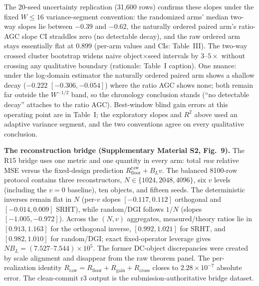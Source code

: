 The 20-seed uncertainty replication (31{,}600 rows) confirms these slopes under the fixed $W\le16$ variance-segment convention: the randomized arms' median two-way slopes lie between $-0.39$ and $-0.62$, the naturally ordered paired arm's ratio-AGC slope CI straddles zero (no detectable decay), and the raw ordered arm stays essentially flat at $0.899$ (per-arm values and CIs: Table~III). The two-way crossed cluster bootstrap widens naive object$\times$seed intervals by $3$--$5\times$ without crossing any qualitative boundary (rationale: Table~I caption). One nuance: under the log-domain estimator the naturally ordered paired arm shows a shallow decay ($-0.222$ $[-0.306,-0.054]$) where the ratio AGC shows none; both remain far outside the $W^{-1/2}$ band, so the chronology conclusion stands (``no detectable decay'' attaches to the ratio AGC). Best-window blind gain errors at this operating point are in Table~I; the exploratory slopes and $R^2$ above used an adaptive variance segment, and the two conventions agree on every qualitative conclusion.

\noindent\textbf{The reconstruction bridge (Supplementary Material S2, Fig.~9).} The R15 bridge uses one metric and one quantity in every arm: total \emph{raw} relative MSE versus the fixed-design prediction $R_{\mathrm{floor}}^{\mathrm{raw}}+B_Lv$. The balanced 8100-row protocol contains three reconstructors, $N\in\{1024,2048,4096\}$, six $v$ levels (including the $v=0$ baseline), ten objects, and fifteen seeds. The deterministic inverses remain flat in $N$ (per-$v$ slopes $[-0.117,0.112]$ orthogonal and $[-0.014,0.009]$ SRHT), while random/DGI follows $1/N$ (slopes $[-1.005,-0.972]$). Across the $(N,v)$ aggregates, measured/theory ratios lie in $[0.913,1.163]$ for the orthogonal inverse, $[0.992,1.021]$ for SRHT, and $[0.982,1.010]$ for random/DGI; exact fixed-operator leverage gives $NB_L=(7.527\text{--}7.544)\times10^5$. The former DC-object discrepancies were created by scale alignment and disappear from the raw theorem panel. The per-realization identity $R_{\mathrm{raw}}=R_{\mathrm{floor}}+R_{\mathrm{gain}}+R_{\mathrm{cross}}$ closes to $2.28\times10^{-7}$ absolute error. The clean-commit r3 output is the submission-authoritative bridge dataset.

